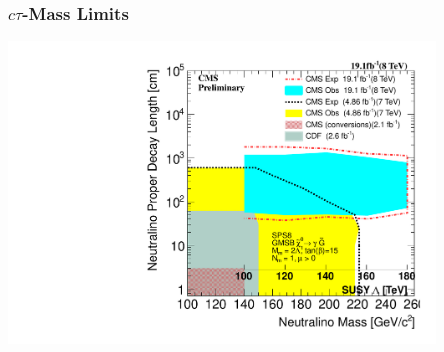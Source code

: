 \documentclass{beamer}
\begin{document}
\begin{frame}
\frametitle{\Huge{$c\tau$-Mass Limits}}
 \begin{minipage}[t]{0.8\linewidth}
      \includegraphics[height= 8cm,width=0.8\paperwidth]{THESISPLOTS/Neutralino_Ctau-Vs-Lambda_2D_exclusion.pdf}
 \end{minipage}
\end{frame}
\end{document}
